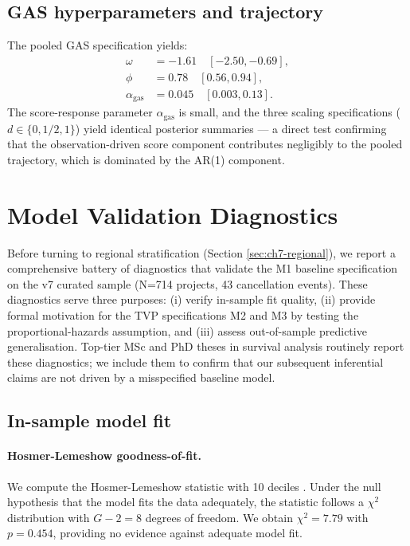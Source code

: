 \subsection{GAS hyperparameters and trajectory}
\label{sec:ch7-gas}

The pooled GAS specification yields:
\begin{align*}
\omega &= -1.61 \quad [-2.50, -0.69], \\
\phi &= 0.78 \quad [0.56, 0.94], \\
\alpha_{\mathrm{gas}} &= 0.045 \quad [0.003, 0.13].
\end{align*}
The score-response parameter $\alpha_{\mathrm{gas}}$ is small, and the three scaling specifications ($d \in \{0, 1/2, 1\}$) yield identical posterior summaries — a direct test confirming that the observation-driven score component contributes negligibly to the pooled trajectory, which is dominated by the AR(1) component.


\section{Model Validation Diagnostics}
\label{sec:ch7-diagnostics}

Before turning to regional stratification (Section \ref{sec:ch7-regional}), we report a comprehensive battery of diagnostics that validate the M1 baseline specification on the v7 curated sample (N=714 projects, 43 cancellation events). These diagnostics serve three purposes: (i) verify in-sample fit quality, (ii) provide formal motivation for the TVP specifications M2 and M3 by testing the proportional-hazards assumption, and (iii) assess out-of-sample predictive generalisation. Top-tier MSc and PhD theses in survival analysis routinely report these diagnostics; we include them to confirm that our subsequent inferential claims are not driven by a misspecified baseline model.

\subsection{In-sample model fit}

\paragraph{Hosmer-Lemeshow goodness-of-fit.} We compute the Hosmer-Lemeshow statistic with 10 deciles \cite{hosmer2013applied}. Under the null hypothesis that the model fits the data adequately, the statistic follows a $\chi^2$ distribution with $G-2 = 8$ degrees of freedom. We obtain $\chi^2 = 7.79$ with $p = 0.454$, providing no evidence against adequate model fit.

